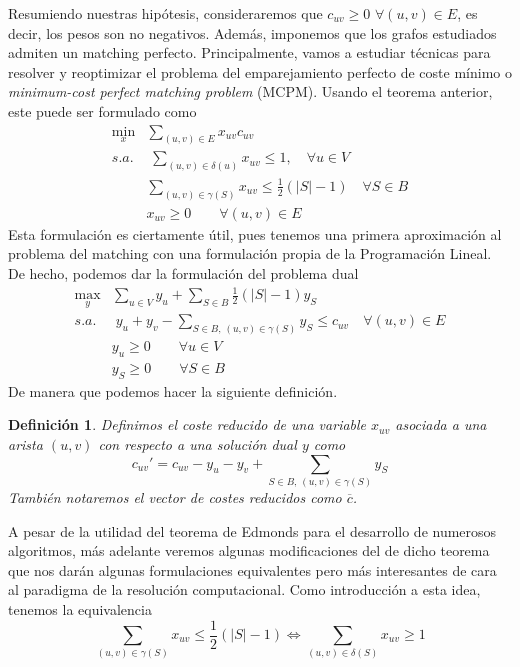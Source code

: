 \documentclass[twoside,a4paper,openright,12pt,tikz]{book}
\newtheorem{defi}{Definici\'on}[section]
\begin{document}
Resumiendo nuestras hipótesis, consideraremos que $c_{uv}\geq 0$ $\forall (u,v)\in E$, es decir, los pesos son no negativos. Además, imponemos que los grafos estudiados admiten un matching perfecto. Principalmente, vamos a estudiar técnicas para resolver y reoptimizar el problema del emparejamiento perfecto de coste mínimo o \textit{minimum-cost perfect matching problem} (MCPM). Usando el teorema anterior, este puede ser formulado como
\begin{align*}
\min_x & \sum_{(u,v) \in E}x_{uv}c_{uv}\\
s.a.&\;\sum_{(u,v)\in\delta(u)} x_{uv} \leq 1, \quad \forall u \in V\\
&\sum_{(u,v)\in \gamma(S)} x_{uv} \leq \frac{1}{2}(|S|-1)\quad \forall S \in B	\\
&x_{uv} \geq 0 \qquad \forall(u,v)\in E
\end{align*}
Esta formulación es ciertamente útil, pues tenemos una primera aproximación al problema del matching con una formulación propia de la Programación Lineal. De hecho, podemos dar la formulación del problema dual
\begin{align*}
\max_y & \sum_{u\in V}y_u + \sum_{S\in B}\frac{1}{2}(|S|-1)y_S\\
s.a.&\;y_u+y_v - \sum_{S\in B,\,(u,v)\in \gamma(S)} y_S \leq c_{uv} \quad \forall (u,v)\in E\\
&y_u \geq 0 \qquad \forall u\in V\\
&y_S \geq 0 \qquad \forall S\in B
\end{align*}
De manera que podemos hacer la siguiente definición.
\begin{defi}
Definimos el coste reducido de una variable $x_{uv}$ asociada a una arista $(u,v)$ con respecto a una solución dual $y$ como
$$
c_{uv}' = c_{uv} -y_u - y_v + \sum_{S\in B,\,(u,v)\in \gamma(S)}y_S 
$$
También notaremos el vector de costes reducidos como $\overline{c}$.
\end{defi}

A pesar de la utilidad del teorema de Edmonds para el desarrollo de numerosos algoritmos, más adelante veremos algunas modificaciones del de dicho teorema que nos darán algunas formulaciones equivalentes pero más interesantes de cara al paradigma de la resolución computacional. Como introducción a esta idea, tenemos la equivalencia
$$
\sum_{(u,v)\in \gamma(S)} x_{uv} \leq \frac{1}{2}(|S|-1) \Leftrightarrow \sum_{(u,v)\in \delta(S)} x_{uv} \geq 1
$$
\newpage
\end{document}
